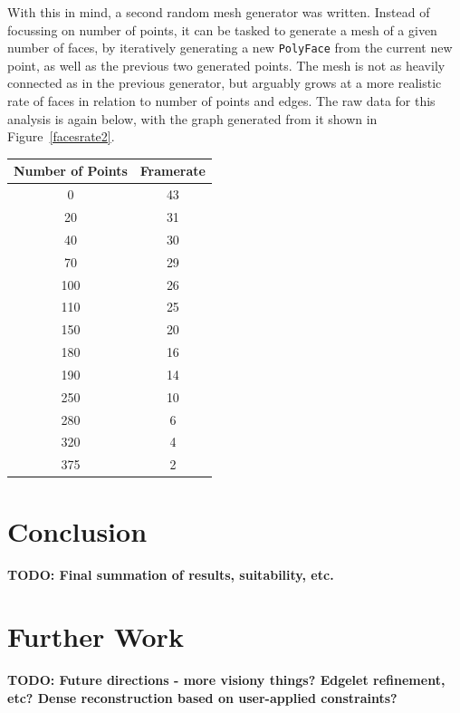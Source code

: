 \documentclass[a4paper,10pt]{article}
\begin{document}
With this in mind, a second random mesh generator was written. Instead of focussing on number of points, it can be tasked to generate a mesh of a given number of faces, by iteratively generating a new \texttt{PolyFace} from the current new point, as well as the previous two generated points. The mesh is not as heavily connected as in the previous generator, but arguably grows at a more realistic rate of faces in relation to number of points and edges. The raw data for this analysis is again below, with the graph generated from it shown in Figure~\ref{facesrate2}.

\begin{center}
\begin{tabular}{| c || c |} 
\hline
\textbf{Number of Points}	& \textbf{Framerate} \\
\hline
\hline
0	& 43 \\
20	& 31 \\
40	& 30 \\
70	& 29 \\
100	& 26 \\
110	& 25 \\
150	& 20 \\
180	& 16 \\
190	& 14 \\
250	& 10 \\
280	& 6 \\
320	& 4 \\
375	& 2 \\
\hline
\end{tabular}
\end{center}

\section{Conclusion}

\textbf{TODO: Final summation of results, suitability, etc.}

\section{Further Work}

\textbf{TODO: Future directions - more visiony things? Edgelet refinement, etc? Dense reconstruction based on user-applied constraints?}

\clearpage
\renewcommand*{\refname}{\section{References}}


\end{document}
